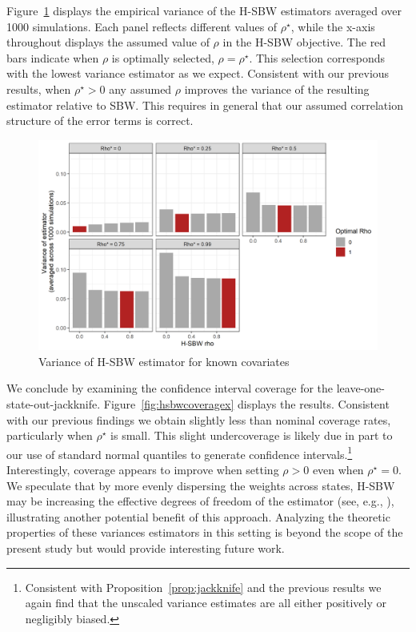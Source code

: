Figure~\ref{fig:hsbwvarx} displays the empirical variance of the H-SBW estimators averaged over 1000 simulations. Each panel reflects different values of $\rho^\star$, while the x-axis throughout displays the assumed value of $\rho$ in the H-SBW objective. The red bars indicate when $\rho$ is optimally selected, $\rho = \rho^\star$. This selection corresponds with the lowest variance estimator as we expect. Consistent with our previous results, when $\rho^\star > 0$ any assumed $\rho$ improves the variance of the resulting estimator relative to SBW. This requires in general that our assumed correlation structure of the error terms is correct.

\begin{figure}[H]
\begin{center}
    \caption{Variance of H-SBW estimator for known covariates}\label{fig:hsbwvarx}
    \includegraphics[scale=0.5]{01_Plots/variance-x-plot.png}
\end{center}
\end{figure}

We conclude by examining the confidence interval coverage for the leave-one-state-out-jackknife. Figure~\ref{fig:hsbwcoveragex} displays the results. Consistent with our previous findings we obtain slightly less than nominal coverage rates, particularly when $\rho^\star$ is small. This slight undercoverage is likely due in part to our use of standard normal quantiles to generate confidence intervals.\footnote{Consistent with Proposition~\ref{prop:jackknife} and the previous results we again find that the unscaled variance estimates are all either positively or negligibly biased.} Interestingly, coverage appears to improve when setting $\rho > 0$ even when $\rho^\star = 0$. We speculate that by more evenly dispersing the weights across states, H-SBW may be increasing the effective degrees of freedom of the estimator (see, e.g., \cite{cameron2015practitioner}), illustrating another potential benefit of this approach. Analyzing the theoretic properties of these variances estimators in this setting is beyond the scope of the present study but would provide interesting future work.

